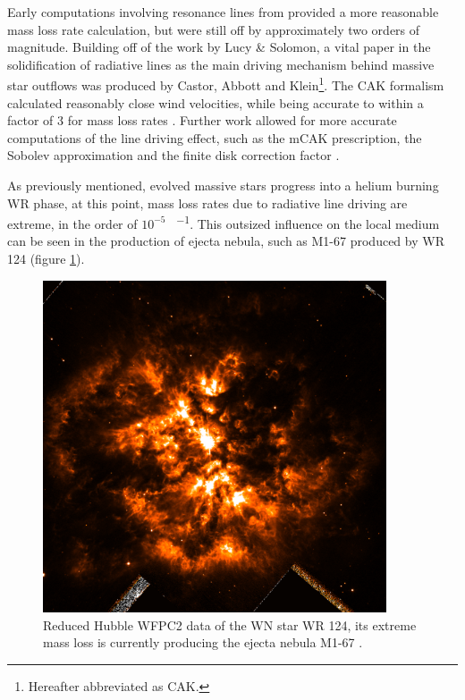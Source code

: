 

Early computations involving resonance lines from \cite{lucy_mass_1970} provided a more reasonable mass loss rate calculation, but were still off by approximately two orders of magnitude.
Building off of the work by Lucy \& Solomon, a vital paper in the solidification of radiative lines as the main driving mechanism behind massive star outflows was produced by Castor, Abbott and Klein\footnote{Hereafter abbreviated as CAK.}.
The CAK formalism calculated reasonably close wind velocities, while being accurate to within a factor of 3 for mass loss rates \parencite{castor_radiation-driven_1975}.
Further work allowed for more accurate computations of the line driving effect, such as the mCAK prescription, the Sobolev approximation and the finite disk correction factor \parencite{pauldrachRadiationdrivenWindsHot1986}.


As previously mentioned, evolved massive stars progress into a helium burning WR phase, at this point, mass loss rates due to radiative line driving are extreme, in the order of $10^{-5}$ \si{\solarmass\per\year}.
This outsized influence on the local medium can be seen in the production of ejecta nebula, such as M1-67 produced by WR 124 (figure \ref{fig:wr124}).

\begin{figure}[h]
  \centering
  \includegraphics[width=4in]{assets/WR124.png}
  \caption[M1-67 nebula around WR 124]{Reduced Hubble WFPC2 data of the WN star WR 124, its extreme mass loss is currently producing the ejecta nebula M1-67 \parencite{2010ApJ...724L..90M}.}
  \label{fig:wr124}
\end{figure}

